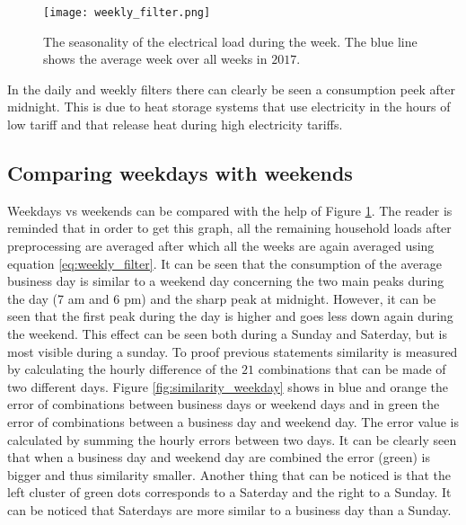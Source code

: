 \begin{figure}[h!]
	\centering
	\texttt{[image: weekly\_filter.png]}
	\caption{The seasonality of the electrical load during the week. The blue line shows the average week over all weeks in $ 2017 $. }
	\label{fig:weekly_filter}
\end{figure}



In the daily and weekly filters there can clearly be seen a consumption peek after midnight. This is due to heat storage systems that use electricity in the hours of low tariff and that release heat during high electricity tariffs. 

\subsection{Comparing weekdays with weekends} \label{s:Comparing weekdays with weekends}
Weekdays vs weekends can be compared with the help of Figure \ref{fig:weekly_filter}. The reader is reminded that in order to get this graph, all the remaining household loads after preprocessing are averaged after which all the weeks are again averaged using equation \ref{eq:weekly_filter}. It can be seen that the consumption of the average business day is similar to a weekend day concerning the two main peaks during the day (7 am and 6 pm) and the sharp peak at midnight. However, it can be seen that the first peak during the day is higher and goes less down again during the weekend. This effect can be seen both during a Sunday and Saterday, but is most visible during a sunday. To proof previous statements similarity is measured by calculating the hourly difference of the $ 21 $ combinations that can be made of two different days. Figure \ref{fig:similarity_weekday} shows in blue and orange the error of combinations between business days or weekend days and in green the error of combinations between a business day and weekend day. The error value is calculated by summing the hourly errors between two days. It can be clearly seen that when a business day and weekend day are combined the error (green) is bigger and thus similarity smaller. Another thing that can be noticed is that the left cluster of green dots corresponds to a Saterday and the right to a Sunday. It can be noticed that Saterdays are more similar to a business day than a Sunday. 

